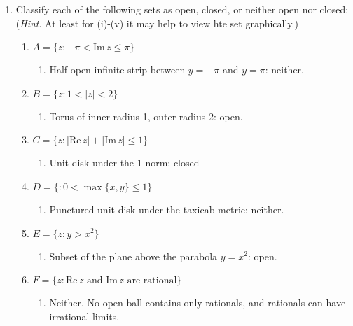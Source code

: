\documentclass[12pt,a4paper]{article}
\renewcommand{\Im}{\text{Im}\,}
\renewcommand{\Re}{\text{Re}\,}
\begin{document}
\begin{enumerate}[label={\bfseries II.5.\arabic*}]
\begin{enumerate}[label={\bfseries Theorem 1.\arabic*}]
\begin{proof}
				On the other hand, suppose we have a finite union of closed sets. By the same argument, the
				complement is a finite intersection of open sets. Since this is open, the complement is closed,
				and so closed subsets are closed under finite unions.
			\end{proof}
		\end{enumerate}

	\item Classify each of the following sets as open, closed, or neither open nor closed:
	(\textit{Hint}. At least for (i)-(v) it may help to view hte set graphically.)

	\begin{enumerate}[label=(\roman*)]
		\item $A = \{z : -\pi < \Im z \leq \pi \}$
			\begin{enumerate}
				\item[] Half-open infinite strip between $y=-\pi$ and $y=\pi$: neither.
			\end{enumerate}
		\item $B = \{ z : 1 < |z| < 2\}$
			\begin{enumerate}
				\item[] Torus of inner radius 1, outer radius 2: open.
			\end{enumerate}
		\item $C = \{ z : |\Re z| + |\Im z| \leq 1\}$
			\begin{enumerate}
				\item[] Unit disk under the 1-norm: closed
			\end{enumerate}
		\item $D = \{ : 0 < \max\{x,y\} \leq 1\}$
			\begin{enumerate}
				\item[] Punctured unit disk under the taxicab metric: neither.
			\end{enumerate}
		\item $E = \{z : y > x^2 \}$
			\begin{enumerate}
				\item[] Subset of the plane above the parabola $y=x^2$: open.
			\end{enumerate}
		\item $F = \{z : \Re z \text{ and } \Im z \text{ are rational}\}$
			\begin{enumerate}
				\item[] Neither. No open ball contains only rationals, and rationals can have
				irrational limits.
			\end{enumerate}
	\end{enumerate}


\end{enumerate}
\end{document}
